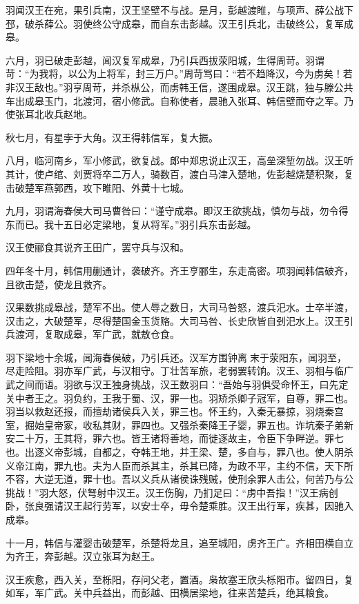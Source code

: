 \documentclass[]{article}
\begin{document}
羽闻汉王在宛，果引兵南，汉王坚壁不与战。是月，彭越渡睢，与项声、薛公战下邳，破杀薛公。羽使终公守成皋，而自东击彭越。汉王引兵北，击破终公，复军成皋。

六月，羽已破走彭越，闻汉复军成皋，乃引兵西拔荥阳城，生得周苛。羽谓苛：``为我将，以公为上将军，封三万户。''周苛骂曰：``若不趋降汉，今为虏矣！若非汉王敌也。''羽亨周苛，并杀枞公，而虏韩王信，遂围成皋。汉王跳，独与滕公共车出成皋玉门，北渡河，宿小修武。自称使者，晨驰入张耳、韩信壁而夺之军。乃使张耳北收兵赵地。

秋七月，有星孛于大角。汉王得韩信军，复大振。

八月，临河南乡，军小修武，欲复战。郎中郑忠说止汉王，高垒深堑勿战。汉王听其计，使卢绾、刘贾将卒二万人，骑数百，渡白马津入楚地，佐彭越烧楚积聚，复击破楚军燕郭西，攻下睢阳、外黄十七城。

九月，羽谓海春侯大司马曹咎曰：``谨守成皋。即汉王欲挑战，慎勿与战，勿令得东而已。我十五日必定梁地，复从将军。''羽引兵东击彭越。

汉王使郦食其说齐王田广，罢守兵与汉和。

四年冬十月，韩信用蒯通计，袭破齐。齐王亨郦生，东走高密。项羽闻韩信破齐，且欲击楚，使龙且救齐。

汉果数挑成皋战，楚军不出。使人辱之数日，大司马咎怒，渡兵汜水。士卒半渡，汉击之，大破楚军，尽得楚国金玉货赂。大司马咎、长史欣皆自刭汜水上。汉王引兵渡河，复取成皋，军广武，就敖仓食。

羽下梁地十余城，闻海春侯破，乃引兵还。汉军方围钟离末于荥阳东，闻羽至，尽走险阻。羽亦军广武，与汉相守。丁壮苦军旅，老弱罢转饷。汉王、羽相与临广武之间而语。羽欲与汉王独身挑战，汉王数羽曰：``吾始与羽俱受命怀王，曰先定关中者王之。羽负约，王我于蜀、汉，罪一也。羽矫杀卿子冠军，自尊，罪二也。羽当以救赵还报，而擅劫诸侯兵入关，罪三也。怀王约，入秦无暴掠，羽烧秦宫室，掘始皇帝冢，收私其财，罪四也。又强杀秦降王子婴，罪五也。诈坑秦子弟新安二十万，王其将，罪六也。皆王诸将善地，而徙逐故主，令臣下争畔逆。罪七也。出逐义帝彭城，自都之，夺韩王地，并王梁、楚，多自与，罪八也。使人阴杀义帝江南，罪九也。夫为人臣而杀其主，杀其已降，为政不平，主约不信，天下所不容，大逆无道，罪十也。吾以义兵从诸侯诛残贼，使刑余罪人击公，何苦乃与公挑战！''羽大怒，伏弩射中汉王。汉王伤胸，乃扪足曰：``虏中吾指！''汉王病创卧，张良强请汉王起行劳军，以安士卒，毋令楚乘胜。汉王出行军，疾甚，因驰入成皋。

十一月，韩信与灌婴击破楚军，杀楚将龙且，追至城阳，虏齐王广。齐相田横自立为齐王，奔彭越。汉立张耳为赵王。

汉王疾愈，西入关，至栎阳，存问父老，置酒。枭故塞王欣头栎阳市。留四日，复如军，军广武。关中兵益出，而彭越、田横居梁地，往来苦楚兵，绝其粮食。
\end{document}
